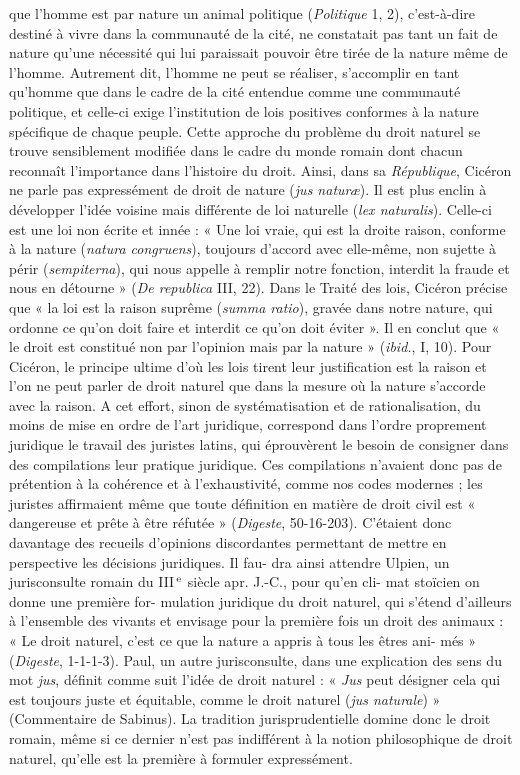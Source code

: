 que l’homme est par nature un animal
politique ({\it Politique} 1, 2), c’est-à-dire destiné à vivre dans la communauté de la
cité, ne constatait pas tant un fait de
nature qu'une nécessité qui lui paraissait
pouvoir être tirée de la nature même de
l’homme. Autrement dit, l’homme ne
peut se réaliser, s’accomplir en tant
qu'homme que dans le cadre de la cité
entendue comme une communauté politique, et celle-ci exige l’institution de lois
positives conformes à la nature spécifique
de chaque peuple. Cette approche du problème du droit naturel se trouve sensiblement modifiée dans le cadre du monde
romain dont chacun reconnaît l’importance dans l’histoire du droit. Ainsi, dans
sa {\it République}, Cicéron ne parle pas
expressément de droit de nature ({\it jus
naturæ}). Il est plus enclin à développer
l'idée voisine mais différente de loi naturelle ({\it lex naturalis}). Celle-ci est une loi
non écrite et innée : « Une loi vraie, qui
est la droite raison, conforme à la nature
({\it natura congruens}), toujours d’accord
avec elle-même, non sujette à périr ({\it sempiterna}), qui nous appelle à remplir notre
fonction, interdit la fraude et nous en
détourne » ({\it De republica} III, 22). Dans le
Traité des lois, Cicéron précise que « la loi
%
est la raison suprême ({\it summa ratio}), gravée dans notre nature, qui ordonne ce
qu'on doit faire et interdit ce qu’on doit
éviter ». Il en conclut que « le droit est
constitué non par l’opinion mais par la
nature » ({\it ibid.}, I, 10). Pour Cicéron, le
principe ultime d’où les lois tirent leur
justification est la raison et l’on ne peut
parler de droit naturel que dans la mesure
où la nature s'accorde avec la raison. A
cet effort, sinon de systématisation et
de rationalisation, du moins de mise en
ordre de l’art juridique, correspond dans
l’ordre proprement juridique le travail des
juristes latins, qui éprouvèrent le besoin
de consigner dans des compilations leur
pratique juridique. Ces compilations
n'avaient donc pas de prétention à la
cohérence et à l’exhaustivité, comme nos
codes modernes ; les juristes affirmaient
même que toute définition en matière de
droit civil est « dangereuse et prête à être
réfutée » ({\it Digeste}, 50-16-203). C’étaient
donc davantage des recueils d’opinions
discordantes permettant de mettre en
perspective les décisions juridiques. Il fau-
dra ainsi attendre Ulpien, un jurisconsulte
romain du {\footnotesize III}$^\text{\,e}$ siècle apr. J.-C., pour qu'en cli-
mat stoïcien on donne une première for-
mulation juridique du droit naturel, qui
s'étend d’ailleurs à l’ensemble des vivants
et envisage pour la première fois un droit
des animaux : « Le droit naturel, c’est ce
que la nature a appris à tous les êtres ani-
més » ({\it Digeste}, 1-1-1-3). Paul, un autre
jurisconsulte, dans une explication des
sens du mot {\it jus}, définit comme suit l’idée
de droit naturel : « {\it Jus} peut désigner cela
qui est toujours juste et équitable, comme
le droit naturel ({\it jus naturale}) » (Commentaire de Sabinus). La tradition jurisprudentielle domine donc le droit romain,
même si ce dernier n’est pas indifférent à
la notion philosophique de droit naturel,
qu'elle est la première à formuler expressément.

